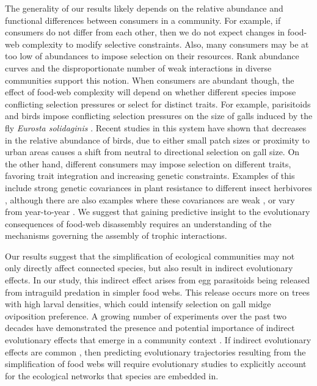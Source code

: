 \documentclass[11pt,]{article}
\begin{document}
The generality of our results likely depends on the relative abundance
and functional differences between consumers in a community. For
example, if consumers do not differ from each other, then we do not
expect changes in food-web complexity to modify selective constraints.
Also, many consumers may be at too low of abundances to impose selection
on their resources. Rank abundance curves \citep{Preston1948} and the
disproportionate number of weak interactions in diverse communities
\citep{Paine1992} support this notion. When consumers are abundant
though, the effect of food-web complexity will depend on whether
different species impose conflicting selection pressures or select for
distinct traits. For example, parisitoids and birds impose conflicting
selection pressures on the size of galls induced by the fly
\emph{Eurosta solidaginis} \citep{Weis1985, Abrahamson1997, Start2016}.
Recent studies in this system have shown that decreases in the relative
abundance of birds, due to either small patch sizes \citep{Start2016} or
proximity to urban areas \citep{Start2018} causes a shift from neutral
to directional selection on gall size. On the other hand, different
consumers may impose selection on different traits, favoring trait
integration and increasing genetic constraints. Examples of this include
strong genetic covariances in plant resistance to different insect
herbivores \citep{Maddox1990, Wise2007, Wise2013}, although there are
also examples where these covariances are weak
\citep{Roche1997, Barbour2015}, or vary from year-to-year
\citep{Johnson2007}. We suggest that gaining predictive insight to the
evolutionary consequences of food-web disassembly requires an
understanding of the mechanisms governing the assembly of trophic
interactions.

Our results suggest that the simplification of ecological communities
may not only directly affect connected species, but also result in
indirect evolutionary effects. In our study, this indirect effect arises
from egg parasitoids being released from intraguild predation in simpler
food webs. This release occurs more on trees with high larval densities,
which could intensify selection on gall midge oviposition preference. A
growing number of experiments over the past two decades have
demonstrated the presence and potential importance of indirect
evolutionary effects that emerge in a community context
\citep{Juenger1998, Stinchcombe2001, Lankau2007, Walsh2008, Walsh2010, terHorst2010, Sahli2011, Lau2012, terHorst2015, Schiestl2018, StartInPress}.
If indirect evolutionary effects are common \citep{Walsh2013}, then
predicting evolutionary trajectories resulting from the simplification
of food webs will require evolutionary studies to explicitly account for
the ecological networks that species are embedded in.
\end{document}
